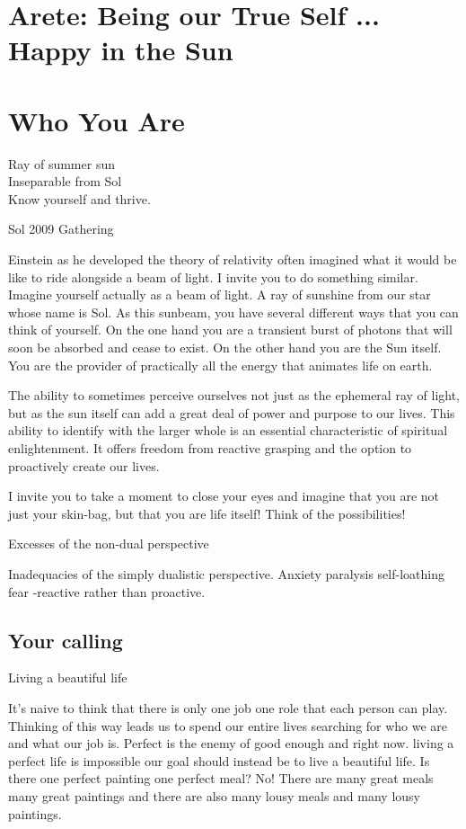 \documentclass[ebook,12pt,openany,twoside]{memoir}
\newcommand{\imagefacingchapter}[1]{
  \cleartoverso
  \clearpage \null
  \thispagestyle{cleared}
  \AddToShipoutPictureBG*{%
    \AtStockLowerLeft{%
      \texttt{[image: \#1]}
    }
  }
  \clearpage
}
\begin{document}
\chapter{Arete: Being our True Self ... Happy in the Sun}


\imagefacingchapter{images/RayOfSummerSun-cropped}
\chapter{Who You Are}

\setlength\epigraphwidth{1.8in}
\epigraph{
  Ray of summer sun\\
  Inseparable from Sol\\
  Know yourself and thrive.
}{Sol 2009 Gathering}

\noindent Einstein as he developed the theory of relativity often imagined what it would
be like to ride alongside a beam of light. I invite you to do something
similar. Imagine yourself actually as a beam of light. A ray of sunshine from
our star whose name is Sol. As this sunbeam, you have several different ways
that you can think of yourself. On the one hand you are a transient burst of
photons that will soon be absorbed and cease to exist. On the other hand you
are the Sun itself. You are the provider of practically all the energy that
animates life on earth.

The ability to sometimes perceive ourselves not just as the ephemeral ray of
light, but as the sun itself can add a great deal of power and purpose to our
lives. This ability to identify with the larger whole is an essential
characteristic of spiritual enlightenment. It offers freedom from reactive
grasping and the option to proactively create our lives.

I invite you to take a moment to close your eyes and imagine that you are not
just your skin-bag, but that you are life itself! Think of the possibilities!

Excesses of the non-dual perspective

Inadequacies of the simply dualistic perspective. Anxiety paralysis
self-loathing fear -reactive rather than proactive.


\section*{Your calling}

Living a beautiful life

It's naive to think that there is only one job one role that each person can
play. Thinking of this way leads us to spend our entire lives searching for who
we are and what our job is. Perfect is the enemy of good enough and right now.
living a perfect life is impossible our goal should instead be to live a
beautiful life. Is there one perfect painting one perfect meal? No! There are
many great meals many great paintings and there are also many lousy meals and
many lousy paintings.
\end{document}
